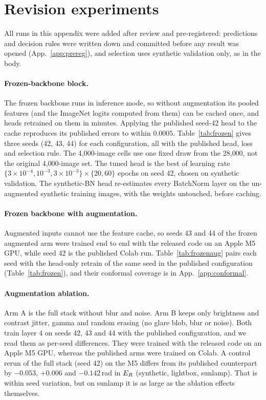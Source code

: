 \section{Revision experiments}
\label{app:revision}

All runs in this appendix were added after review and pre-registered: predictions and
decision rules were written down and committed before any result was opened
(App.~\ref{app:prereg}), and selection uses synthetic validation only, as in the body.

\paragraph{Frozen-backbone block.} The frozen backbone runs in inference mode, so without
augmentation its pooled features (and the ImageNet logits computed from them) can be cached
once, and heads retrained on them in minutes. Applying the published seed-42 head to the
cache reproduces its published errors to within $0.0005$. Table~\ref{tab:frozen} gives three
seeds (42, 43, 44) for each configuration, all with the published head, loss and selection
rule. The 4{,}000-image cells use one fixed draw from the 28{,}000, not the original
4{,}000-image set. The tuned head is the best of learning rate $\{3{\times}10^{-4}, 10^{-3},
3{\times}10^{-3}\}\times\{20, 60\}$ epochs on seed 42, chosen on synthetic validation. The
synthetic-BN head re-estimates every BatchNorm layer on the un-augmented synthetic training
images, with the weights untouched, before caching.


\paragraph{Frozen backbone with augmentation.} Augmented inputs cannot use the feature cache,
so seeds 43 and 44 of the frozen augmented arm were trained end to end with the released code
on an Apple M5 GPU, while seed 42 is the published Colab run. Table~\ref{tab:frozenaug} pairs
each seed with the head-only retrain of the same seed in the published configuration
(Table~\ref{tab:frozen}), and their conformal coverage is in App.~\ref{app:conformal}.


\paragraph{Augmentation ablation.} Arm A is the full stack without blur and noise. Arm B keeps
only brightness and contrast jitter, gamma and random erasing (no glare blob, blur or noise).
Both train layer 4 on seeds 42, 43 and 44 with the published configuration, and we read them
as per-seed differences. They were trained with the released code on an Apple M5 GPU, whereas
the published arms were trained on Colab. A control rerun of the full stack (seed 42) on the
M5 differs from its published counterpart by $-0.053$, $+0.006$ and $-0.142$\,rad in $E_{R}$
(synthetic, lightbox, sunlamp). That is within seed variation, but on sunlamp it is as large
as the ablation effects themselves.



